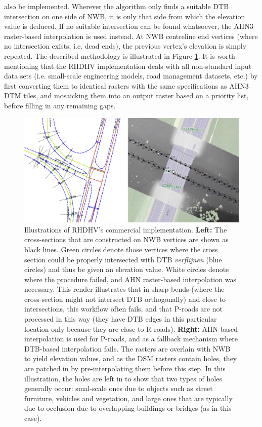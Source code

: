 also be implemented. Wherever the algorithm only finds a suitable DTB intersection on one side of NWB, it is only that side from which the elevation value is deduced. If no suitable intersection can be found whatsoever, the AHN3 raster-based interpolation is used instead. At NWB centreline end vertices (where no intersection exists, i.e. dead ends), the previous vertex’s elevation is simply repeated. The described methodology is illustrated in Figure \ref{fig:rhdhv}. It is worth mentioning that the RHDHV implementation deals with all non-standard input data sets (i.e. small-scale engineering models, road management datasets, etc.) by first converting them to identical rasters with the same specifications as AHN3 DTM tiles, and mosaicking them into an output raster based on a priority list, before filling in any remaining gaps.

\begin{figure}[h]
    \centering
    \includegraphics[width=\linewidth]{p2/figs/rhdhv_combined.png} 
    \caption{Illustrations of RHDHV's commercial implementation. \textbf{Left:} The cross-sections that are constructed on NWB vertices are shown as black lines. Green circles denote those vertices where the cross section could be properly intersected with DTB \textit{verflijnen} (blue circles) and thus be given an elevation value. White circles denote where the procedure failed, and AHN raster-based interpolation was necessary. This render illustrates that in sharp bends (where the cross-section might not intersect DTB orthogonally) and close to intersections, this workflow often fails, and that P-roads are not processed in this way (they have DTB edges in this particular location only because they are close to R-roads). \textbf{Right:} AHN-based interpolation is used for P-roads, and as a fallback mechanism where DTB-based interpolation fails. The rasters are overlain with NWB to yield elevation values, and as the DSM rasters contain holes, they are patched in by pre-interpolating them before this step. In this illustration, the holes are left in to show that two types of holes generally occur: smal-scale ones due to objects such as street furniture, vehicles and vegetation, and large ones that are typically due to occlusion due to overlapping buildings or bridges (as in this case).}
    \label{fig:rhdhv}
\end{figure}

